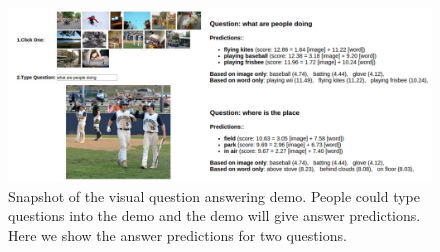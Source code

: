 \documentclass{article} %
\begin{document}
\begin{figure}
\begin{center}
\includegraphics[width=1\linewidth]{demo.pdf}
\end{center}
\caption{Snapshot of the visual question answering demo. People could type questions into the demo and the demo will give answer predictions. Here we show the answer predictions for two questions.}\label{vqa_demo}
\end{figure}







\end{document}
